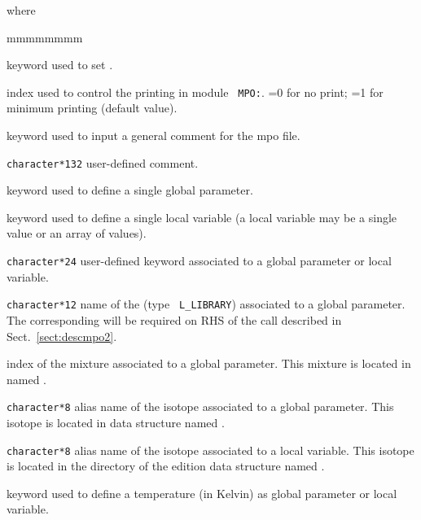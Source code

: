 \goodbreak
\noindent where
\begin{ListeDeDescription}{mmmmmmmm}

\item[\moc{EDIT}] keyword used to set .

\item[\dusa{iprint}] index used to control the printing in module {\tt
MPO:}. =0 for no print; =1 for minimum printing (default value).

\item[\moc{COMM}] keyword used to input a general comment for the {\sc mpo} file.

\item[\dusa{comment}] {\tt character*132} user-defined comment.

\item[\moc{PARA}] keyword used to define a single global parameter.

\item[\moc{LOCA}] keyword used to define a single local variable (a local variable
may be a single value or an array of values).

\item[\dusa{parkey}] {\tt character*24} user-defined keyword associated to a global
parameter or local variable.

\item[\dusa{micnam}] {\tt character*12} name of the  (type {\tt
L\_LIBRARY}) associated to a global parameter. The corresponding  will be required on
RHS of the  call described in Sect.~\ref{sect:descmpo2}.

\item[\dusa{imix}] index of the mixture associated to a global parameter. This mixture is
located in  named .

\item[\dusa{isonam1}] {\tt character*8} alias name of the isotope associated to a global
parameter. This isotope is located in  data structure named .

\item[\dusa{isonam2}] {\tt character*8} alias name of the isotope associated to a local
variable. This isotope is located in the  directory of the {\sc edition}
data structure named .

\item[\moc{TEMP}] keyword used to define a temperature (in Kelvin) as global parameter or
local variable.


\end{ListeDeDescription}
